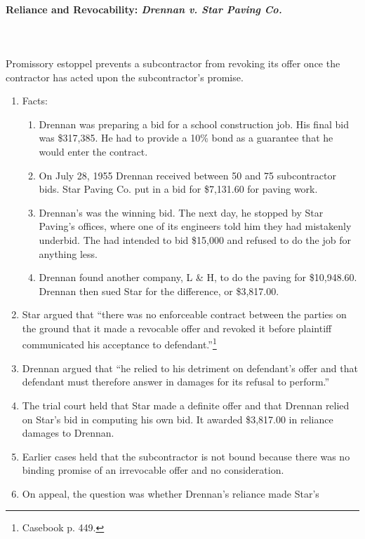 \paragraph{Reliance and Revocability: \emph{Drennan v. Star Paving Co.}}
~\\\\
Promissory estoppel prevents a subcontractor from revoking its offer once the 
contractor has acted upon the subcontractor's promise.

\begin{enumerate}
    \item Facts:
    \begin{enumerate}
        \item Drennan was preparing a bid for a school construction job. His 
        final bid was \$317,385. He had to provide a 10\% bond as a guarantee 
        that he would enter the contract.
        \item On July 28, 1955 Drennan received between 50 and 75 
        subcontractor bids. Star Paving Co. put in a bid for \$7,131.60 for 
        paving work.
        \item Drennan's was the winning bid. The next day, he stopped by Star 
        Paving's offices, where one of its engineers told him they had 
        mistakenly underbid. The had intended to bid \$15,000 and refused to 
        do the job for anything less.
        \item Drennan found another company, L \& H, to do the paving for 
        \$10,948.60. Drennan then sued Star for the difference, or \$3,817.00.
    \end{enumerate}
    \item Star argued that ``there was no enforceable contract between the 
    parties on the ground that it made a revocable offer and revoked it before 
    plaintiff communicated his acceptance to defendant.''\footnote{Casebook p. 
    449.}
    \item Drennan argued that ``he relied to his detriment on defendant's 
    offer and that defendant must therefore answer in damages for its refusal 
    to perform.''
    \item The trial court held that Star made a definite offer and that 
    Drennan relied on Star's bid in computing his own bid. It awarded 
    \$3,817.00 in reliance damages to Drennan.
    \item Earlier cases held that the subcontractor is not bound because there 
    was no binding promise of an irrevocable offer and no consideration.
    \item On appeal, the question was whether Drennan's reliance made Star's 

\end{enumerate}
